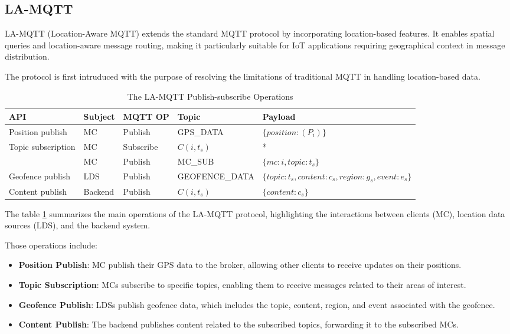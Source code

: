 \documentclass[12pt,a4paper,twoside]{book}
\begin{document}
\subsection{LA-MQTT}
LA-MQTT (Location-Aware MQTT) extends the standard MQTT protocol by incorporating location-based features. It enables spatial queries and location-aware message routing, making it particularly suitable for IoT applications requiring geographical context in message distribution.

The protocol is first intruduced with the purpose of resolving the limitations of traditional MQTT in handling location-based data\cite{montori2022lamqtt}.

\begin{table}[h]
\small
\begin{tabularx}{\linewidth}{|l|X|X|X|p{4cm}|}
\hline
\textbf{API} & \textbf{Subject} & \textbf{MQTT OP} & \textbf{Topic} & \textbf{Payload} \\ \hline
Position publish & MC & Publish & GPS\_DATA & $\{position: ( P_i )\}$ \\ \hline
Topic subscription & MC & Subscribe & $C(i, t_s)$ & * \\ \cline{2-5}
 & MC & Publish & MC\_SUB & $\{ mc: i, topic: t_s \}$ \\ \hline
Geofence publish & LDS & Publish & GEOFENCE\_DATA & $\{topic: t_s, content: c_s, $\newline$region: g_s, event: e_s\}$ \\ \hline
Content publish & Backend & Publish & $C(i, t_s)$ & $\{content: c_s\}$ \\ \hline
\end{tabularx}
\caption{The LA-MQTT Publish-subscribe Operations}
\label{table:la-mqtt}
\end{table}

The table \ref{table:la-mqtt} summarizes the main operations of the LA-MQTT protocol, highlighting the interactions between clients (MC), location data sources (LDS), and the backend system.

Those operations include:
\begin{itemize}
    \item \textbf{Position Publish}: MC publish their GPS data to the broker, allowing other clients to receive updates on their positions.
    \item \textbf{Topic Subscription}: MCs subscribe to specific topics, enabling them to receive messages related to their areas of interest.
    \item \textbf{Geofence Publish}: LDSs publish geofence data, which includes the topic, content, region, and event associated with the geofence.
    \item \textbf{Content Publish}: The backend publishes content related to the subscribed topics, forwarding it to the subscribed MCs.
\end{itemize}
\end{document}
